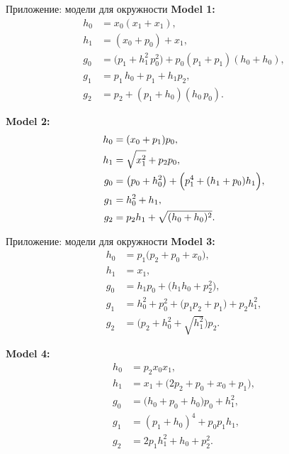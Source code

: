 \documentclass{beamer}
\begin{document}
\begin{frame}{Приложение: модели для окружности}
\textbf{Model 1:}
    \begin{align*}
    h_0 &= x_0(x_1 + x_1),\\
    h_1 &= (x_0 + p_0) + x_1,\\
    g_0 &= \bigl(p_1 + h_1^2\,p_0^2\bigr) + p_0(p_1 + p_1)(h_0 + h_0),\\
    g_1 &= p_1\,h_0 + p_1 + h_1p_2,\\
    g_2 &= p_2 + (p_1 + h_0)(h_0\,p_0).
    \end{align*}
    
\textbf{Model 2:}
    \begin{align*}
    h_0 &= (x_0 + p_1)p_0,\\
    h_1 &= \sqrt{x_1^2} + p_2p_0,\\
    g_0 &= \bigl(p_0 + h_0^2\bigr) + \Bigl(p_1^4 + (h_1 + p_0)h_1\Bigr),\\
    g_1 &= h_0^2 + h_1,\\
    g_2 &= p_2h_1 + \sqrt{(h_0 + h_0)^2}.
    \end{align*}
\end{frame}
\begin{frame}{Приложение: модели для окружности}
    \textbf{Model 3:}
    \begin{align*}
    h_0 &= p_1\bigl(p_2 + p_0 + x_0\bigr),\\
    h_1 &= x_1,\\
    g_0 &= h_1p_0 + \bigl(h_1h_0 + p_2^2\bigr),\\
    g_1 &= h_0^2 + p_0^2 + \bigl(p_1p_2 + p_1\bigr) + p_2h_1^2,\\
    g_2 &= \bigl(p_2 + h_0^2 + \sqrt{h_1^2}\bigr)p_2.
    \end{align*}
    
    \textbf{Model 4:}
    \begin{align*}
    h_0 &= p_2x_0x_1,\\
    h_1 &= x_1 + \bigl(2p_2 + p_0 + x_0 + p_1\bigr),\\
    g_0 &= \bigl(h_0 + p_0 + h_0\bigr)p_0 + h_1^2,\\
    g_1 &= (p_1 + h_0)^4 + p_0p_1h_1,\\
    g_2 &= 2p_1h_1^2 + h_0 + p_2^2.
    \end{align*}
\end{frame}
\end{document}
